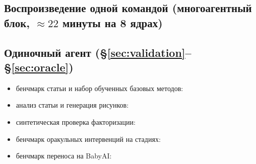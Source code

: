 \documentclass{article}
\begin{document}
\subsection*{Воспроизведение одной командой (многоагентный блок, $\approx 22$ минуты на 8 ядрах)}

\subsection*{Одиночный агент (\S\ref{sec:validation}--\S\ref{sec:oracle})}
\begin{itemize}[leftmargin=16pt]
\item бенчмарк статьи и набор обученных базовых методов: 
\item анализ статьи и генерация рисунков: 
\item синтетическая проверка факторизации: 
\item бенчмарк оракульных интервенций на стадиях: 
\item бенчмарк переноса на BabyAI: 
\end{itemize}
\end{document}
